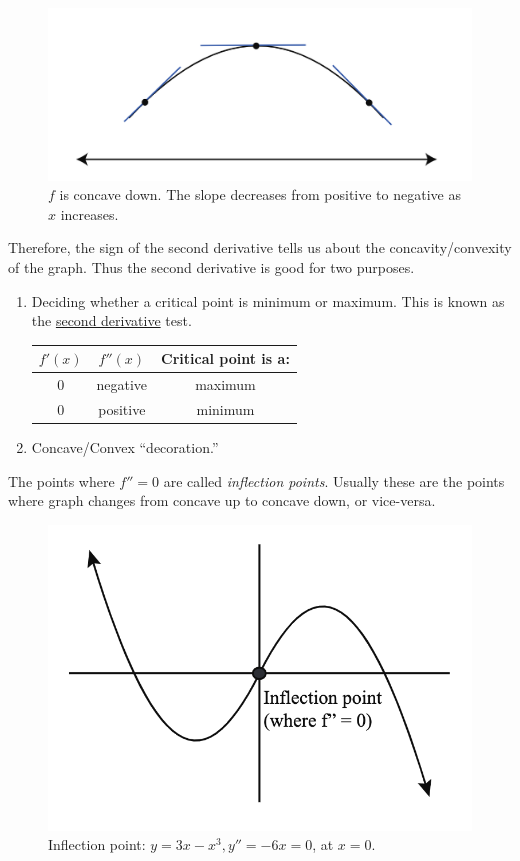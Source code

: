 \begin{figure}[ht!]
	\centering
	\includegraphics[scale=0.65]{./images/lecture_8_figure_2.png}
	\caption{$f$ is concave down. The slope decreases from positive to negative as $x$ increases.}
\end{figure}


Therefore, the sign of the second derivative tells us about the concavity/convexity of the graph.
Thus the second derivative is good for two purposes.

\begin{enumerate}
	\item Deciding whether a critical point is minimum or maximum. This is known as the \underline{second derivative} test.
	\begin{center}
	\begin{tabular}{ |c|c|c| }
		\hline
		$f'(x)$ & $f''(x)$ & Critical point is a: \\
		\hline
		$0$ & negative & maximum \\
		\hline
		$0$ & positive & minimum \\
		\hline
	\end{tabular}
	\end{center}
	\item Concave/Convex ``decoration.''
\end{enumerate}

The points where $f'' = 0$ are called \textit{inflection points}.
Usually these are the points where graph changes from concave up to concave down, or vice-versa.

\begin{figure}[ht!]
	\centering
	\includegraphics[scale=0.65]{./images/lecture_8_figure_3.png}
	\caption{Inflection point: $y = 3x - x^3, y'' = -6x = 0$, at $x = 0$.}
\end{figure}